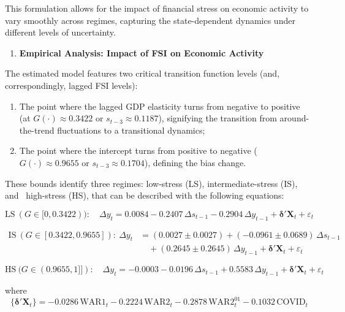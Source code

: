 \documentclass[12pt,preprint,aps,author-year]{revtex4-1}
\begin{document}
This formulation allows for the impact of financial stress on economic activity to vary smoothly across regimes, capturing the state-dependent dynamics under different levels of uncertainty.

\begin{enumerate}
\item \textbf{Empirical Analysis: Impact of FSI on Economic Activity}
\end{enumerate}
The estimated model features two critical transition function levels (and, correspondingly, lagged FSI levels):

\begin{enumerate}
\item The point where the lagged GDP elasticity turns from negative to positive (at $G(\cdot) \approx 0.3422$ or $s_{t-3} \approx 0.1187$), signifying the transition from around-the-trend fluctuations to a transitional dynamics;
\item The point where the intercept turns from positive to negative ($G(\cdot) \approx 0.9655$ or $s_{t-3} \approx 0.1704$), defining the bias change.
\end{enumerate}
These bounds identify three regimes: low-stress (LS), intermediate-stress (IS), and  high-stress (HS), that can be described with the following equations:

\begin{equation}\label{eq:lsreg}
\text{LS}\ (G \in [0,0.3422)):\quad \Delta y_t = 0.0084 - 0.2407\,\Delta s_{t-1} - 0.2904\,\Delta y_{t-1} + \boldsymbol{\delta}'\mathbf{X}_t + \varepsilon_t
\end{equation}


\begin{equation}\label{eq:isreg}
\begin{aligned}
\text{IS}\ (G\in[0.3422,0.9655]):\ \Delta y_t
&=(0.0027\pm0.0027)+(-0.0961\pm0.0689)\,\Delta s_{t-1}\\
&\quad+(0.2645\pm0.2645)\,\Delta y_{t-1}+\boldsymbol{\delta}'\mathbf{X}_t+\varepsilon_t
\end{aligned}
\end{equation}

\begin{equation}\label{eq:hstr}
\text{HS}\ (G \in (0.9655,1]]):\quad \Delta y_t = -0.0003 - 0.0196\,\Delta s_{t-1} + 0.5583\,\Delta y_{t-1} + \boldsymbol{\delta}'\mathbf{X}_t + \varepsilon_t
\end{equation}

where
\begin{equation}\label{eq:exog}
\{\boldsymbol{\delta}'\mathbf{X}_t\}= -0.0286\,\text{WAR1}_t - 0.2224\,\text{WAR2}_t - 0.2878\,\text{WAR2}^{01}_t - 0.1032\,\text{COVID}_t
\end{equation}
\end{document}
